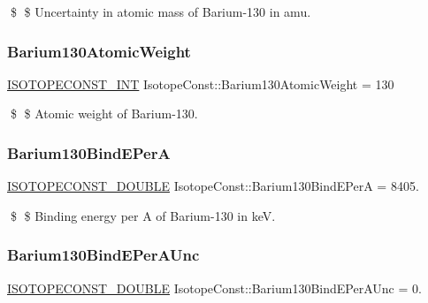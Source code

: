 \$ \$ Uncertainty in atomic mass of Barium-\/130 in amu. \mbox{\label{group___isotope_const-_barium-_ba130_gaa74ac1bf68da2c93698c091feb49fe19}} 
\subsubsection{\texorpdfstring{Barium130\+Atomic\+Weight}{Barium130AtomicWeight}}
{\footnotesize\ttfamily \mbox{\hyperlink{group___isotope_const-_macros_ga5f18360b3e99483a35c32d789e62621c}{I\+S\+O\+T\+O\+P\+E\+C\+O\+N\+S\+T\+\_\+\+I\+NT}} Isotope\+Const\+::\+Barium130\+Atomic\+Weight = 130}

\$ \$ Atomic weight of Barium-\/130. \mbox{\label{group___isotope_const-_barium-_ba130_ga17a482fa38568368e2b15c01609c152e}} 
\subsubsection{\texorpdfstring{Barium130\+Bind\+E\+PerA}{Barium130BindEPerA}}
{\footnotesize\ttfamily \mbox{\hyperlink{group___isotope_const-_macros_ga8f45a7272ce02c0b4c65c44636ed719a}{I\+S\+O\+T\+O\+P\+E\+C\+O\+N\+S\+T\+\_\+\+D\+O\+U\+B\+LE}} Isotope\+Const\+::\+Barium130\+Bind\+E\+PerA = 8405.}

\$ \$ Binding energy per A of Barium-\/130 in keV. \mbox{\label{group___isotope_const-_barium-_ba130_ga13fa12be9ce1701e7cfc891115538051}} 
\subsubsection{\texorpdfstring{Barium130\+Bind\+E\+Per\+A\+Unc}{Barium130BindEPerAUnc}}
{\footnotesize\ttfamily \mbox{\hyperlink{group___isotope_const-_macros_ga8f45a7272ce02c0b4c65c44636ed719a}{I\+S\+O\+T\+O\+P\+E\+C\+O\+N\+S\+T\+\_\+\+D\+O\+U\+B\+LE}} Isotope\+Const\+::\+Barium130\+Bind\+E\+Per\+A\+Unc = 0.}

